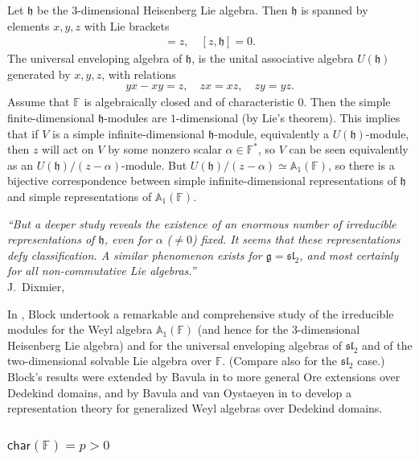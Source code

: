 \documentclass{commat}
\newcommand{\FF}{\mathbb{F}}
\newcommand{\wa}[1][1]{\mathbb{A}_{#1}}
\newcommand\chara{\mathsf {char}}
\newcommand{\g}{\mathfrak g}
\newcommand{\h}{\mathfrak h}
\newcommand{\fsl}{\mathfrak{sl}}
\newcommand{\lb}[1]{\left[ #1\right]}
\begin{document}
\begin{example}
	Let $\mathfrak h$ be the $3$-dimensional Heisenberg Lie algebra. Then $\mathfrak h$ is spanned by elements $x, y, z$ with Lie brackets
	\begin{align*}
		[y, x]=z, \quad \lb{z,\mathfrak h}=0.
	\end{align*}
	The universal enveloping algebra of $\mathfrak h$, is the unital associative algebra $U(\mathfrak h)$ generated by $x, y, z$, with relations
	\begin{align*}
		yx-xy=z,\quad zx=xz, \quad zy=yz.
	\end{align*}
	Assume that $\FF$ is algebraically closed and of characteristic $0$. Then the simple finite-dimensional $\mathfrak h$-modules are $1$-dimensional (by Lie's theorem). This implies that if $V$ is a simple infinite-dimensional $\mathfrak h$-module, equivalently a $U(\mathfrak h)$-module, then $z$ will act on $V$ by some nonzero scalar $\alpha\in\FF^*$, so $V$ can be seen equivalently as an $U(\mathfrak h)/(z-\alpha)$-module. But $U(\mathfrak h)/(z-\alpha)\simeq \wa(\FF)$, so there is a bijective correspondence between simple infinite-dimensional representations of $\h$ and simple representations of $\wa(\FF)$.
\end{example}


\begin{flushright}{\it
		``But a deeper study reveals the existence of an enormous number of irreducible representations of $\h$, even for $\alpha$ ($\neq 0$) fixed. It seems that these representations defy classification. A similar phenomenon exists for $\g=\fsl_2$, and most certainly for all non-commutative Lie algebras.''} \\
	J.\ Dixmier, \cite[Preface]{jD77book}
\end{flushright}


In \cite{rB81}, Block undertook a remarkable and comprehensive study of the irreducible modules for the Weyl algebra $\wa(\FF)$ (and hence for the $3$-dimensional Heisenberg Lie algebra) and for the universal enveloping algebras of 
$\mathfrak{sl}_2$ and of the two-dimensional solvable Lie algebra over $\FF$. (Compare also \cite{AP74} for the $\mathfrak{sl}_2$ case.) Block's results were extended by Bavula in \cite{vB99} to more general Ore extensions over Dedekind domains, and by Bavula and van Oystaeyen in  \cite{BvO97}  to develop a representation theory for generalized Weyl algebras over Dedekind domains.  

\subsubsection{\texorpdfstring{$\chara(\FF)=p>0$}{char(F)=p>0}}
\end{document}
